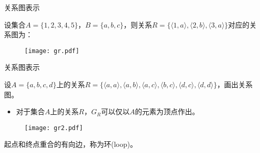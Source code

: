 \begin{frame}[t]{关系图表示}
\pause
\begin{exam}
  设集合$A=\{1,2,3,4,5\}$，$B=\{a,b,c\}$，则关系$R=\{\langle1,a\rangle,\langle 2,b\rangle,\langle 3,a\rangle\}$对应的关系图为：
  \pause
\begin{figure}
  \centering
  \texttt{[image: gr.pdf]}
\end{figure}
\end{exam}
\end{frame}

\begin{frame}{关系图表示}
\pause
\begin{exam}
  设$A=\{a,b,c,d\}$上的关系$R=\{\langle a,a\rangle,\langle a,b\rangle,\langle a,c\rangle,\langle b,c\rangle,\langle d,c\rangle,\langle d,d\rangle\}$，画出关系图。
\end{exam}
\pause
\vspace{1ex}
\begin{itemize}
  \item 对于集合$A$上的关系$R$，$G_R$可以仅以$A$的元素为顶点作出。 \pause
\end{itemize}

\begin{figure}
  \centering
  \texttt{[image: gr2.pdf]}
\end{figure}
\pause
\finger 起点和终点重合的有向边，称为\alert{环(loop)}。

\end{frame} 